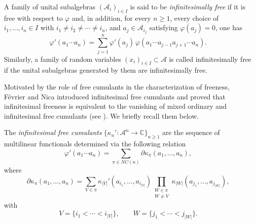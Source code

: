 \documentclass{article}
\theoremstyle{definition}
\begin{document}
A family of unital subalgebras $(\mathcal A_i)_{i\in I}$ is said to be
\emph{infinitesimally free} if it is free with respect to $\varphi$ and, in
addition, for every $n\ge1$, every choice of
$i_1,\ldots,i_n\in I$ with
$i_1\neq i_2\neq\cdots\neq i_n$, and
$a_j\in\mathcal A_{i_j}$ satisfying
$\varphi(a_j)=0$, one has
\[
\varphi'(a_1\cdots a_n)
=
\sum_{j=1}^n
\varphi'(a_j)\,
\varphi(a_1\cdots a_{j-1}a_{j+1}\cdots a_n).
\]
Similarly, a family of random variables $(x_i)_{i\in I}\subset \mathcal A$ is called infinitesimally free
if the unital subalgebras generated by them are infinitesimally free.

Motivated by the role of free cumulants in the characterization of freeness, F\'evrier and Nica introduced infinitesimal free cumulants and proved that infinitesimal freeness is equivalent to the vanishing of mixed ordinary and infinitesimal free cumulants (see \cite{FN10}). We briefly recall them below.

The \emph{infinitesimal free cumulants}
$\{\kappa_n':\mathcal A^n\to\mathbb C\}_{n\ge1}$
are the sequence of multilinear functionals determined via the following relation
\[
\varphi'(a_1\cdots a_n)
=
\sum_{\pi\in NC(n)}
\partial\kappa_\pi(a_1,\ldots,a_n),
\]
where
\[
\partial\kappa_\pi(a_1,\ldots,a_n)
=
\sum_{V\in\pi}
\kappa_{|V|}'
(a_{i_1},\ldots,a_{i_{|V|}})
\prod_{\substack{W\in\pi\\ W\neq V}}
\kappa_{|W|}
(a_{j_1},\ldots,a_{j_{|W|}}),
\]
with
\[
V=\{i_1<\cdots<i_{|V|}\},
\qquad
W=\{j_1<\cdots<j_{|W|}\}.
\]
\end{document}

